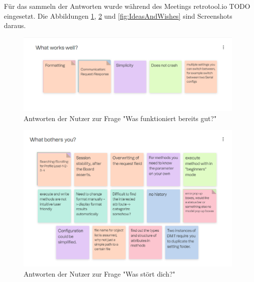 Für das sammeln der Antworten wurde während des Meetings retrotool.io TODO eingesetzt.
Die Abbildungen \ref{fig:WhatWorksWell}, \ref{fig:WhatBothersYou} und \ref{fig:IdeasAndWishes} sind Screenshots daraus.



\begin{figure}[H]
   \centering
   \includegraphics[width=1.0\textwidth]{gfx/S1_RetroBoard_WhatWorksWell.png}
   \caption{
       Antworten der Nutzer zur Frage "Was funktioniert bereits gut?"
   }
   \label{fig:WhatWorksWell}
\end{figure}

\begin{figure}[H]
   \centering
   \includegraphics[width=1.0\textwidth]{gfx/S1_RetroBoard_WhatBothersYou.png}
   \caption{
       Antworten der Nutzer zur Frage "Was stört dich?"
   }
   \label{fig:WhatBothersYou}
\end{figure}


